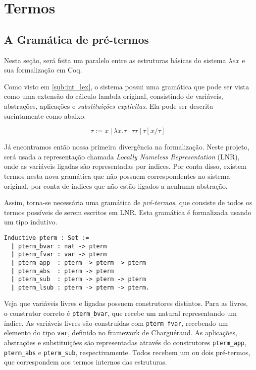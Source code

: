 \section{Termos}
\subsection{A Gramática de pré-termos}
\label{sec:termos}

Nesta seção, será feita um paralelo entre as estruturas básicas do sistema
$\lambda ex$ e sua formalização em Coq.

Como visto em \ref{sub:int_lex}, o sistema possui uma gramática que pode ser vista como
uma extensão do cálculo lambda original, consistindo de variáveis, abstrações,
aplicações e \emph{substituições explícitas}. Ela pode ser descrita sucintamente
como abaixo.

\[ \tau := x\ |\ \lambda x.\tau\ |\ \tau \tau\ |\ \tau[x/\tau]\ \]

Já encontramos então nossa primeira divergência na formalização. Neste projeto,
será usada a representação chamada \textit{Locally Nameless Representation}
(LNR), onde as variáveis ligadas são representadas por índices. Por conta disso,
existem termos nesta nova gramática que não possuem correspondentes no sistema
original, por conta de índices que não estão ligados a nenhuma abstração.

Assim, torna-se necessária uma gramática de \emph{pré-termos}, que consiste de
todos os termos possíveis de serem escritos em LNR. Esta gramática é formalizada
usando um tipo indutivo.
\pagebreak

\begin{lstlisting}[basicstyle=\small]
Inductive pterm : Set :=
  | pterm_bvar : nat -> pterm
  | pterm_fvar : var -> pterm
  | pterm_app  : pterm -> pterm -> pterm
  | pterm_abs  : pterm -> pterm
  | pterm_sub  : pterm -> pterm -> pterm 
  | pterm_lsub : pterm -> pterm -> pterm.
\end{lstlisting}

Veja que variáveis livres e ligadas possuem construtores distintos. Para as
livres, o construtor correto é \texttt{pterm\_bvar}, que recebe um natural
representando um índice. As variáveis livres são construídas com
\texttt{pterm\_fvar}, recebendo um elemento do tipo \texttt{var}, definido no
framework de Charguéraud.
As aplicações, abstrações e substituições são representadas através do
construtores \texttt{pterm\_app}, \texttt{pterm\_abs} e \texttt{pterm\_sub},
respectivamente. Todos recebem um ou dois pré-termos, que correspondem aos
termos internos das estruturas.

